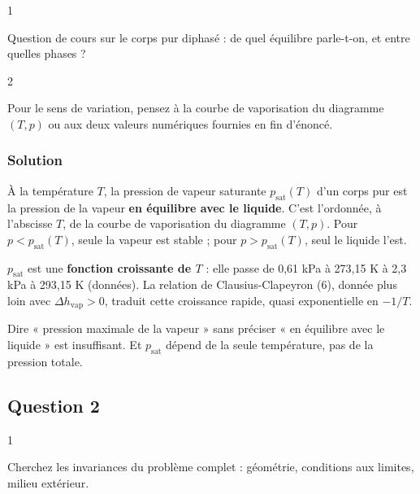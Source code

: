 \documentclass[11pt,a4paper]{article}
\begin{document}
\begin{indication}{1}

Question de cours sur le corps pur diphasé : de quel équilibre parle-t-on, et entre quelles phases ?

\end{indication}

\begin{indication}{2}

Pour le sens de variation, pensez à la courbe de vaporisation du diagramme \((T,p)\) ou aux deux valeurs numériques fournies en fin d'énoncé.

\end{indication}

\hypertarget{solution}{%
\subsubsection{Solution}\label{solution}}

À la température \(T\), la pression de vapeur saturante \(p_{\text{sat}}(T)\) d'un corps pur est la pression de la vapeur \textbf{en équilibre avec le liquide}. C'est l'ordonnée, à l'abscisse \(T\), de la courbe de vaporisation du diagramme \((T,p)\). Pour \(p<p_{\text{sat}}(T)\), seule la vapeur est stable ; pour \(p>p_{\text{sat}}(T)\), seul le liquide l'est.

\(p_{\text{sat}}\) est une \textbf{fonction croissante de \(T\)} : elle passe de 0,61 kPa à 273,15 K à 2,3 kPa à 293,15 K (données). La relation de Clausius-Clapeyron (6), donnée plus loin avec \(\Delta h_{\text{vap}}>0\), traduit cette croissance rapide, quasi exponentielle en \(-1/T\).

\begin{piege}

Dire « pression maximale de la vapeur » sans préciser « en équilibre avec le liquide » est insuffisant. Et \(p_{\text{sat}}\) dépend de la seule température, pas de la pression totale.

\end{piege}

\hypertarget{question-2}{%
\subsection{Question 2}\label{question-2}}

\begin{indication}{1}

Cherchez les invariances du problème complet : géométrie, conditions aux limites, milieu extérieur.

\end{indication}
\end{document}
